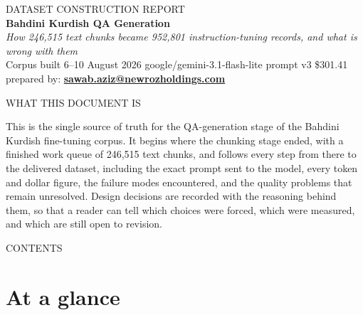 \documentclass[10pt,a4paper]{article}
\makeatletter
\newcommand{\preparedby}{%
  {\uifont\fontsize{8.5}{11}\selectfont\color{inksoft}%
  prepared by: \href{mailto:sawab.aziz@newrozholdings.com}{%
  \textcolor{bluelink}{\textbf{sawab.aziz@newrozholdings.com}}}}}
\makeatother
\begin{document}
\thispagestyle{empty}
\vspace*{6mm}

{\uitrackwide\fontsize{8}{10}\selectfont\color{crail}DATASET CONSTRUCTION REPORT}\\[5mm]
{\headfont\bfseries\fontsize{26}{31}\selectfont\color{ink}Bahdini Kurdish QA Generation}\\[4mm]
{\headfont\itshape\fontsize{12}{16}\selectfont\color{inksoft}How 246,515 text chunks became 952,801 instruction-tuning records, and what is wrong with them}\\[10mm]
{\uifont\fontsize{9}{13}\selectfont\color{inksoft}Corpus built 6--10 August 2026 \quad\textbullet\quad google/gemini-3.1-flash-lite \quad\textbullet\quad prompt v3 \quad\textbullet\quad \$301.41}\\[2mm]
\preparedby

\vspace{7mm}

\begin{softcard}
{\uimed\fontsize{8.5}{11}\selectfont\color{crail}WHAT THIS DOCUMENT IS}\par\vspace{0.3em}
This is the single source of truth for the QA-generation stage of the Bahdini
Kurdish fine-tuning corpus. It begins where the chunking stage ended, with a
finished work queue of 246,515 text chunks, and follows every step from
there to the delivered dataset, including the exact prompt sent to the model,
every token and dollar figure, the failure modes encountered, and the quality
problems that remain unresolved. Design decisions are recorded with the
reasoning behind them, so that a reader can tell which choices were forced,
which were measured, and which are still open to revision.
\end{softcard}

\vspace{2mm}
{\uitracksm\fontsize{8}{11}\selectfont\color{inksoft}CONTENTS}\par\vspace{-0.6em}
{\hypersetup{linkcolor=ink}
\renewcommand{\contentsname}{}
\vspace{-1.2em}
\tableofcontents}

\clearpage

\section{At a glance}
\end{document}
